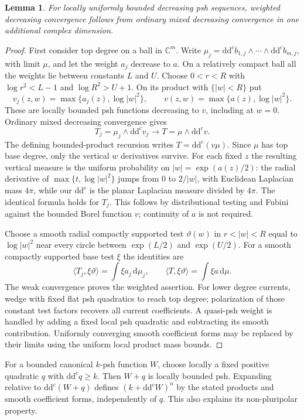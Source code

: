 \documentclass[11pt]{article}
\newtheorem{lemma}[theorem]{Lemma}
\newcommand{\ddc}{\mathrm{d}\mathrm{d}^c}
\begin{document}
\begin{lemma}\label{lem:weighted}
For locally uniformly bounded decreasing psh sequences, weighted
decreasing convergence follows from ordinary mixed decreasing
convergence in one additional complex dimension.
\end{lemma}
\begin{proof}
First consider top degree on a ball in $\mathbb C^m$. Write
$\mu_j=\ddc b_{1,j}\wedge\cdots\wedge\ddc b_{m,j}$, with limit
$\mu$, and let the weight $a_j$ decrease to $a$. On a relatively
compact ball all the weights lie between constants $L$ and $U$.
Choose $0<r<R$ with $\log r^2<L-1$ and $\log R^2>U+1$.
On its product with $\{|w|<R\}$ put
\[
 v_j(z,w)=\max\{a_j(z),\log|w|^2\},\qquad
 v(z,w)=\max\{a(z),\log|w|^2\}.
\]
These are locally bounded psh functions decreasing to $v$, including
at $w=0$. Ordinary mixed decreasing convergence gives
\[
 T_j=\mu_j\wedge\ddc v_j\longrightarrow
 T=\mu\wedge\ddc v.
\]
The defining bounded-product recursion writes $T=\ddc(v\mu)$.
Since $\mu$ has top base degree, only the vertical $w$ derivatives
survive. For each fixed $z$ the resulting vertical measure is the
uniform probability on $|w|=\exp(a(z)/2)$: the radial derivative of
$\max\{t,\log|w|^2\}$ jumps from $0$ to $2/|w|$, with Euclidean
Laplacian mass $4\pi$, while our $\ddc$ is the planar Laplacian
measure divided by $4\pi$. The identical formula holds for $T_j$.
This follows by distributional testing and Fubini against the bounded
Borel function $v$; continuity of $a$ is not required.

Choose a smooth radial compactly supported test $\vartheta(w)$ in
$r<|w|<R$ equal to $\log|w|^2$ near every circle between
$\exp(L/2)$ and $\exp(U/2)$. For a smooth compactly supported base
test $\xi$ the identities are
\[
 \langle T_j,\xi\vartheta\rangle=\int\xi a_j\,\mathrm{d}\mu_j,
 \qquad \langle T,\xi\vartheta\rangle=\int\xi a\,\mathrm{d}\mu.
\]
The weak convergence proves the weighted assertion. For lower degree
currents, wedge with fixed flat psh quadratics to reach top degree;
polarization of those constant test factors recovers all current
coefficients. A quasi-psh weight is handled by adding a fixed local
psh quadratic and subtracting its smooth contribution. Uniformly
converging smooth coefficient forms may be replaced by their limits
using the uniform local product mass bounds.
\end{proof}

For a bounded canonical $k$-psh function $W$, choose locally a fixed
positive quadratic $q$ with $\ddc q\ge k$. Then $W+q$ is locally
bounded psh. Expanding relative to $\ddc(W+q)$ defines
$(k+\ddc W)^n$ by the stated products and smooth coefficient forms,
independently of $q$. This also explains its non-pluripolar property.
\end{document}
